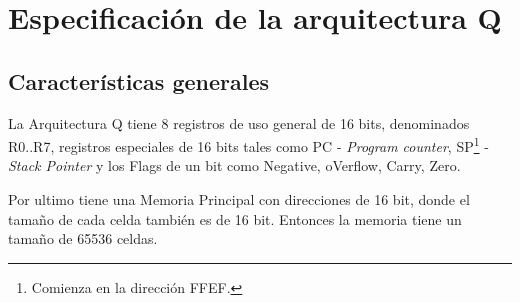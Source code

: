 \section{Especificación de la arquitectura Q}\label{apendiceQ}

\subsection{Características generales} 

La Arquitectura Q tiene 8 registros de uso general de 16 bits, denominados R0..R7, registros especiales de 16 bits tales como PC - \textit{Program counter}, SP\footnote{Comienza en la dirección FFEF.} - \textit{Stack Pointer} y los Flags de un bit como Negative, oVerflow, Carry, Zero. 

Por ultimo tiene una Memoria Principal con direcciones de 16 bit, donde el tamaño de cada celda también es de 16 bit. Entonces la memoria tiene un tamaño de 65536 celdas. \\ 
